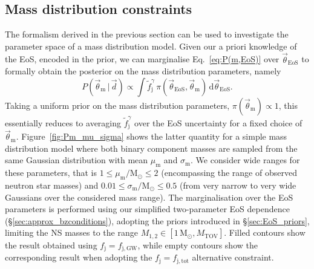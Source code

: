\documentclass[]{aa}
\newcommand{\resp}[1]{#1}
\begin{document}
\subsection{Mass distribution constraints}
\label{sec:mass_distrib_constraints}
The formalism derived in the previous section can be used to investigate the parameter space of a mass distribution model. Given our a priori knowledge of the EoS, encoded in the prior, we can marginalise Eq.~\ref{eq:P(m,EoS)} over $\vec\theta_\mathrm{EoS}$ to formally obtain the posterior on the mass distribution parameters, namely
\begin{equation}
 P(\vec\theta_\mathrm{m}\,|\,\vec d)\propto\int\tilde f_\mathrm{j}^\gamma \,\pi(\vec\theta_\mathrm{EoS},\vec\theta_\mathrm{m})\,\mathrm{d}\vec\theta_\mathrm{EoS}.
 \label{eq:P(m)}
\end{equation}
Taking a uniform prior on the mass distribution parameters, $\pi(\vec\theta_\mathrm{m})\propto 1$, this essentially reduces to averaging $\tilde f_\mathrm{j}^\gamma$ over the EoS uncertainty for a fixed choice of $\vec\theta_\mathrm{m}$.
Figure~\ref{fig:Pm_mu_sigma} shows the latter quantity for a simple mass distribution model where both binary component masses are sampled from the same Gaussian distribution with mean $\mu_\mathrm{m}$ and $\sigma_\mathrm{m}$. \resp{We consider wide ranges for these parameters, that is $1\leq \mu_\mathrm{m}/\mathrm{M_\odot}\leq 2$ (encompassing the range of observed neutron star masses) and $0.01\leq\sigma_\mathrm{m}/\mathrm{M_\odot}\leq 0.5$ (from very narrow to very wide Gaussians over the considered mass range).} The marginalisation over the EoS parameters is performed using our simplified two-parameter EoS dependence (\S\ref{sec:approx_bzconditions}), adopting the priors introduced in \S\ref{sec:EoS_priors}, limiting the NS masses to the range $M_{1,2}\in[1\,\mathrm{M_\odot},M_\mathrm{TOV}]$. Filled contours show the result obtained using $f_\mathrm{j}=f_\mathrm{j,GW}$, while empty contours show the corresponding result when adopting the $f_\mathrm{j}=f_\mathrm{j,tot}$ alternative constraint. 
%
\end{document}
